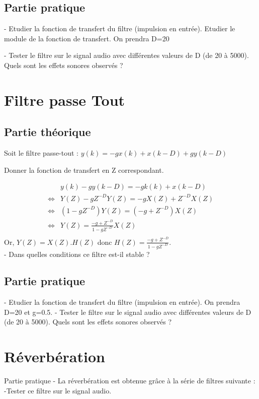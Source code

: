 \clearpage

\subsection{Partie pratique}

- Etudier la fonction de transfert du filtre (impulsion en entrée). Etudier le module de la fonction de transfert. On prendra D=20

- Tester le filtre sur le signal audio avec différentes valeurs de D (de 20 à 5000). Quels sont les effets sonores observés ?

\section{Filtre passe Tout}

\subsection{Partie théorique}

Soit le filtre passe-tout : $y(k) = −gx(k) + x(k − D) + gy(k − D)$

Donner la fonction de transfert en Z correspondant.

\begin{align*}
  &y(k) - gy(k - D) = -gk(k) + x(k - D)\\
  \iff &Y(Z) - gZ^{-D}Y(Z) = -gX(Z) + Z^{-D}X(Z)\\
  \iff &(1 - gZ^{-D})Y(Z) = (-g + Z^{-D})X(Z)\\
  \iff &Y(Z) = \frac{-g + Z^{-D}}{1 - gZ^{-D}}X(Z)\\
\end{align*}
Or, $Y(Z) = X(Z).H(Z)$ donc $H(Z) = \frac{-g + Z^{-D}}{1 - gZ^{-D}}$.\\


- Dans quelles conditions ce filtre est-il stable ?


\subsection{Partie pratique}

- Etudier la fonction de transfert du filtre (impulsion en entrée). On prendra D=20 et g=0.5.
- Tester le filtre sur le signal audio avec différentes valeurs de D (de 20 à 5000). Quels sont
les effets sonores observés ?

\section{Réverbération}

Partie pratique
- La réverbération est obtenue grâce à la série de filtres suivante :
-Tester ce filtre sur le signal audio.
